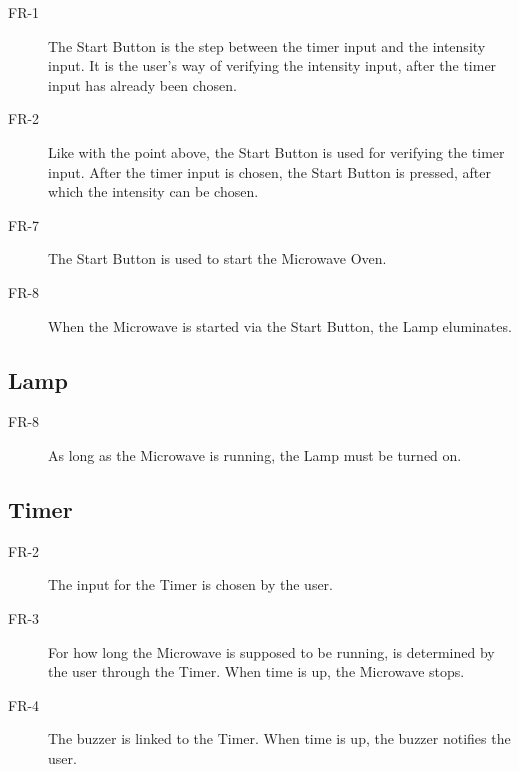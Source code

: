 \begin{description}
	\item[FR-1] The Start Button is the step between the timer input and the intensity input. It is the user's way of verifying the intensity input, after the timer input has already been chosen.  
	\item[FR-2] Like with the point above, the Start Button is used for verifying the timer input. After the timer input is chosen, the Start Button is pressed, after which the intensity can be chosen. 
	\item[FR-7] The Start Button is used to start the Microwave Oven.
	\item[FR-8] When the Microwave is started via the Start Button, the Lamp eluminates. 
\end{description}
\subsection*{Lamp}
	\begin{description}
		\item[FR-8] As long as the Microwave is running, the Lamp must be turned on. 
	\end{description}
\subsection*{Timer}
	\begin{description}
			\item[FR-2] The input for the Timer is chosen by the user.
			\item[FR-3] For how long the Microwave is supposed to be running, is determined by the user through the Timer. When time is up, the Microwave stops.
			\item[FR-4] The buzzer is linked to the Timer. When time is up, the buzzer notifies the user.
	\end{description}
